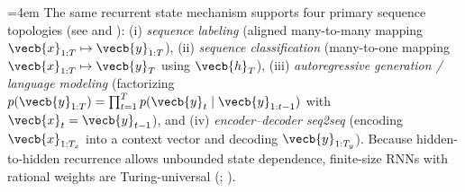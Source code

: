 \documentclass[../../../../master.tex]{subfiles}
\begin{document}
{\sloppy\emergencystretch=4em
The same recurrent state mechanism supports four primary sequence topologies (see  and ): (i) \emph{sequence labeling} (aligned many-to-many mapping $\vecb{x}_{1:T} \mapsto \vecb{y}_{1:T}$), (ii) \emph{sequence classification} (many-to-one mapping $\vecb{x}_{1:T} \mapsto \vecb{y}_T$ using $\vecb{h}_T$), (iii) \emph{autoregressive generation / language modeling} (factorizing $p(\vecb{y}_{1:T}) = \prod_{t=1}^T p(\vecb{y}_t \mid \vecb{y}_{1:t-1})$ with $\vecb{x}_t = \vecb{y}_{t-1}$), and (iv) \emph{encoder--decoder seq2seq} (encoding $\vecb{x}_{1:T_x}$ into a context vector and decoding $\vecb{y}_{1:T_y}$). Because hidden-to-hidden recurrence allows unbounded state dependence, finite-size RNNs with rational weights are Turing-universal (; ).\par}
\end{document}
